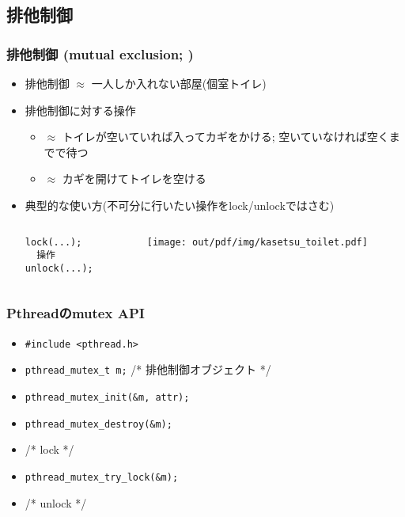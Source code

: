 \documentclass[12pt,dvipdfmx]{beamer}
\begin{document}
\subsection{排他制御}

\begin{frame}[fragile]
  \frametitle{排他制御 (mutual exclusion; )}
  \begin{itemize}
  \item 排他制御 $\approx$ 一人しか入れない部屋(個室トイレ)
  \item 排他制御に対する操作
    \begin{itemize}
    \item {} $\approx$ トイレが空いていれば入ってカギをかける;
      空いていなければ空くまでで待つ
    \item {} $\approx$ カギを開けてトイレを空ける
    \end{itemize}
  \item 典型的な使い方(不可分に行いたい操作をlock/unlockではさむ)
    \begin{columns}
      \begin{column}{0.5\textwidth}
\begin{lstlisting}
lock(...);
  操作
unlock(...);
\end{lstlisting}
      \end{column}
      \begin{column}{0.5\textwidth}
        \begin{center}
\texttt{[image: out/pdf/img/kasetsu\_toilet.pdf]}
        \end{center}
      \end{column}
    \end{columns}
  \end{itemize}
\end{frame}

\begin{frame}
  \frametitle{Pthreadのmutex API}
  \begin{itemize}
  \item {\tt \#include <pthread.h>}
  \item {\tt pthread\_mutex\_t m;} /* 排他制御オブジェクト */
  \item {\tt pthread\_mutex\_init(\&m, attr);}
  \item {\tt pthread\_mutex\_destroy(\&m);}
  \item {}   /* lock */
  \item {\tt pthread\_mutex\_try\_lock(\&m);}
  \item {} /* unlock */
  \end{itemize}
\end{frame}
\end{document}

